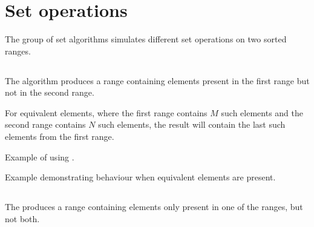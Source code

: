 \section{Set operations}

The group of set algorithms simulates different set operations on two sorted ranges.

\subsection{\texorpdfstring{}{\texttt{std::set\_difference}}}

The  algorithm produces a range containing elements present in the first range but not in the second range.


For equivalent elements, where the first range contains $M$ such elements and the second range contains $N$ such elements, the result will contain the last  such elements from the first range.

\begin{box-note}
\footnotesize Example of using .
\tcblower
{}
\end{box-note}

\begin{box-note}
\footnotesize Example demonstrating  behaviour when equivalent elements are present.
\tcblower
{}
\end{box-note}

\subsection{\texorpdfstring{}{\texttt{std::set\_symmetric\_difference}}}

The  produces a range containing elements only present in one of the ranges, but not both.



